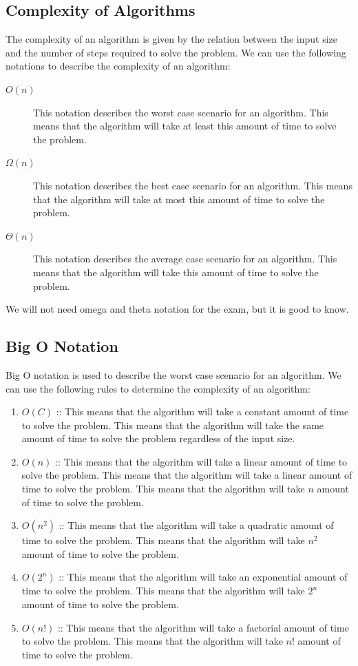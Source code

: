 \documentclass[11pt]{article}
\begin{document}
\subsection{Complexity of Algorithms}
\label{sec:orgce93136}
The complexity of an algorithm is given by the relation between the input size and the number of steps required to solve the problem. We can use the following notations to describe the complexity of an algorithm:
\begin{description}
\item[{\(O(n)\)}] This notation describes the worst case scenario for an algorithm. This means that the algorithm will take at least this amount of time to solve the problem.
\item[{\(\Omega(n)\)}] This notation describes the best case scenario for an algorithm. This means that the algorithm will take at most this amount of time to solve the problem.
\item[{\(\Theta(n)\)}] This notation describes the average case scenario for an algorithm. This means that the algorithm will take this amount of time to solve the problem.
\end{description}

We will not need omega and theta notation for the exam, but it is good to know.
\subsection{Big O Notation}
\label{sec:orge64b635}
Big O notation is used to describe the worst case scenario for an algorithm. We can use the following rules to determine the complexity of an algorithm:
\begin{enumerate}
\item \(O(C)\) :: This means that the algorithm will take a constant amount of time to solve the problem. This means that the algorithm will take the same amount of time to solve the problem regardless of the input size.
\item \(O(n)\) :: This means that the algorithm will take a linear amount of time to solve the problem. This means that the algorithm will take a linear amount of time to solve the problem. This means that the algorithm will take \(n\) amount of time to solve the problem.
\item \(O(n^2)\) :: This means that the algorithm will take a quadratic amount of time to solve the problem. This means that the algorithm will take \(n^2\) amount of time to solve the problem.
\item \(O(2^n)\) :: This means that the algorithm will take an exponential amount of time to solve the problem. This means that the algorithm will take \(2^n\) amount of time to solve the problem.
\item \(O(n!)\) :: This means that the algorithm will take a factorial amount of time to solve the problem. This means that the algorithm will take \(n!\) amount of time to solve the problem.
\end{enumerate}
\end{document}
